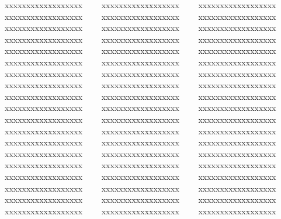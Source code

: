 
{\mktsObeyAllLines{}
    xxxxxxxxxxxxxxxxxx
    xxxxxxxxxxxxxxxxxx
    xxxxxxxxxxxxxxxxxx
    xxxxxxxxxxxxxxxxxx
    xxxxxxxxxxxxxxxxxx
    xxxxxxxxxxxxxxxxxx
    xxxxxxxxxxxxxxxxxx
    xxxxxxxxxxxxxxxxxx
    xxxxxxxxxxxxxxxxxx
    xxxxxxxxxxxxxxxxxx
    xxxxxxxxxxxxxxxxxx
    xxxxxxxxxxxxxxxxxx
    xxxxxxxxxxxxxxxxxx
    xxxxxxxxxxxxxxxxxx
    xxxxxxxxxxxxxxxxxx
    xxxxxxxxxxxxxxxxxx
    xxxxxxxxxxxxxxxxxx
    xxxxxxxxxxxxxxxxxx
    xxxxxxxxxxxxxxxxxx
    xxxxxxxxxxxxxxxxxx
    xxxxxxxxxxxxxxxxxx
    xxxxxxxxxxxxxxxxxx
    xxxxxxxxxxxxxxxxxx
    xxxxxxxxxxxxxxxxxx
    xxxxxxxxxxxxxxxxxx
    xxxxxxxxxxxxxxxxxx
    xxxxxxxxxxxxxxxxxx
    xxxxxxxxxxxxxxxxxx
    xxxxxxxxxxxxxxxxxx
    xxxxxxxxxxxxxxxxxx
    xxxxxxxxxxxxxxxxxx
    xxxxxxxxxxxxxxxxxx
    xxxxxxxxxxxxxxxxxx
    xxxxxxxxxxxxxxxxxx
    xxxxxxxxxxxxxxxxxx
    xxxxxxxxxxxxxxxxxx
    xxxxxxxxxxxxxxxxxx
    xxxxxxxxxxxxxxxxxx
    xxxxxxxxxxxxxxxxxx
    xxxxxxxxxxxxxxxxxx
    xxxxxxxxxxxxxxxxxx
    xxxxxxxxxxxxxxxxxx
    xxxxxxxxxxxxxxxxxx
    xxxxxxxxxxxxxxxxxx
    xxxxxxxxxxxxxxxxxx
    xxxxxxxxxxxxxxxxxx
    xxxxxxxxxxxxxxxxxx
    xxxxxxxxxxxxxxxxxx
    xxxxxxxxxxxxxxxxxx
    xxxxxxxxxxxxxxxxxx
    xxxxxxxxxxxxxxxxxx
    xxxxxxxxxxxxxxxxxx
    xxxxxxxxxxxxxxxxxx
    xxxxxxxxxxxxxxxxxx
    xxxxxxxxxxxxxxxxxx
    xxxxxxxxxxxxxxxxxx
    xxxxxxxxxxxxxxxxxx
}


